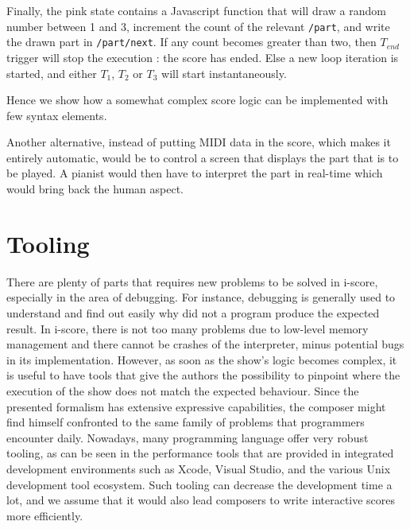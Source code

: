 \documentclass{article}
\begin{document}
Finally, the pink state contains a Javascript function 
that will draw a random number between 1 and 3, 
increment the count of the relevant \verb|/part|, 
and write the drawn part in \verb|/part/next|.
If any count becomes greater than two, then $T_{end}$
trigger will stop the execution : the score has ended. 
Else a new loop iteration is started, and either 
$T_1$, $T_2$ or $T_3$ will start instantaneously.

Hence we show how a somewhat complex score logic 
can be implemented with few syntax elements.

Another alternative, instead of putting MIDI data in the score,
which makes it entirely automatic,  
would be to control a screen that displays the part that is 
to be played.
A pianist would then have to interpret the part 
in real-time which would bring back the human aspect.

\section{Tooling}
There are plenty of parts that requires new problems to be solved in i-score, especially in the area of debugging. 
For instance, debugging is generally used to understand and find out easily why did not a program produce the expected result.
In i-score, there is not too many problems due to low-level memory management and there cannot be crashes of the interpreter, minus potential bugs in its implementation. 
However, as soon as the show's logic becomes complex, it is useful to have tools that give the authors the possibility to pinpoint where the execution of the show does not match the expected behaviour.
Since the presented formalism has extensive expressive capabilities, the composer might find himself confronted to the same family of problems that programmers encounter daily.
Nowadays, many programming language offer very robust tooling, as can be seen in the performance tools that are provided in integrated development environments such as Xcode, Visual Studio, and the various Unix development tool ecosystem\cite{spinellis2014software}.
Such tooling can decrease the development time a lot, and we assume that it would also lead composers to write interactive scores more efficiently.
\end{document}
